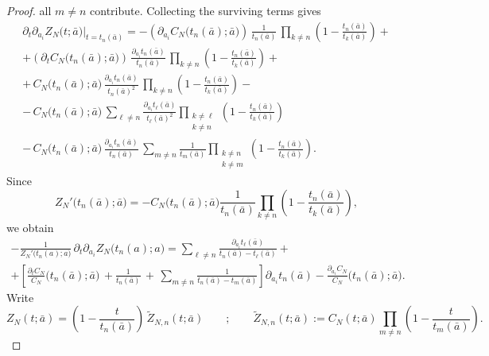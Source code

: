\documentclass[12pt,reqno]{amsart}
\theoremstyle{plain}
\theoremstyle{definition}
\theoremstyle{remark}
\begin{document}
\begin{proof}
all \(m\neq n\) contribute. Collecting the surviving terms gives 
\begin{multline}\label{eq:pieces-at-tn}
\partial_t\partial_{a_i} Z_N\bigl(t;\bar a\bigr)\Big|_{t=t_n(\bar a)}
=  -(\partial_{a_i} C_N \!\bigl(t_n(\bar a);\bar a \bigr)) \,
\frac{1}{t_n(\bar a)}\,
\prod_{k\ne n}\!\left(1-\frac{t_n(\bar a)}{t_k(\bar a)}\right) +\\+
(\partial_t C_N \!\bigl(t_n(\bar a); \bar a \bigr) ) \,
\frac{\partial_{a_i} t_n(\bar a)}{t_n(\bar a)}\,
\prod_{k\ne n}\!\left(1-\frac{t_n(\bar a)}{t_k(\bar a)}\right)+
\\
+\, C_N \!\bigl(t_n(\bar a) ; \bar a\bigr)\,
\frac{\partial_{a_i} t_n(\bar a)}{t_n(\bar a)^2}\,
\prod_{k\ne n}\!\left(1-\frac{t_n(\bar a)}{t_k(\bar a)}\right)-
\\
-\, C_N\!\bigl(t_n(\bar a) ; \bar a\bigr)\,
\sum_{\ell\ne n}\frac{\partial_{a_i} t_\ell(\bar a)}{t_\ell(\bar a)^2}
\prod_{\substack{k\ne \ell\\ k\ne n}}\!\left(1-\frac{t_n(\bar a)}{t_k(\bar a)}\right)
\\
-\, C_N \!\bigl(t_n(\bar a) ; \bar a \bigr)\,
\frac{\partial_{a_i} t_n(\bar a)}{t_n(\bar a)}\,
\sum_{m\ne n}\frac{1}{t_m(\bar a)}
\prod_{\substack{k\ne n\\ k\ne m}}\!\left(1-\frac{t_n(\bar a)}{t_k(\bar a)}\right).
\end{multline}
Since
\begin{equation}
\label{eq:Zder}
Z_N'\bigl(t_n(\bar a);\bar a\bigr)=-C_N\bigl(t_n(\bar a) ; \bar a \bigr) \frac{1}{t_n (\bar a) } \prod_{k\neq n}\! \left (1-\frac{t_n(\bar a)}{t_k (\bar a)} \right ),
\end{equation}
we obtain
\begin{multline}\label{eq:mixed-id}
-\frac{1}{Z_N'\bigl(t_n(a);a\bigr)}\,\partial_t\partial_{a_i}Z_N\bigl(t_n(a);a\bigr)
=\sum_{\ell\ne n}
\frac{\partial_{a_i} t_\ell(\bar a)}{t_n(\bar a)-t_{\ell}(\bar a) }+\\+
 \left [ \frac{\partial_t C_N}{ C_N} \!\bigl(t_n(\bar a);\bar a \bigr)\,
+
\frac{1}{t_n(\bar a)}\,
+
\,
\sum_{m\ne n}
\frac{1}{t_n (\bar a) -t_m(\bar a)}\right ] \partial_{a_i} t_n(\bar a)- \frac{\partial_{a_i} C_N}{ C_N} \!\bigl(t_n(\bar a);\bar a \bigr).
\end{multline}
Write
\begin{equation}
Z_N(t;\bar a)=\left (1-\frac{t}{t_n(\bar a)} \right )\,\widetilde{Z}_{N,n}(t;\bar a) \qquad ;\qquad
\widetilde{Z}_{N,n}(t;\bar a):=C_N(t;\bar a)\!\!\prod_{m\neq n}\! \left (1-\frac{t}{t_m(\bar a)} \right).

\end{equation}
\end{proof}
\end{document}
